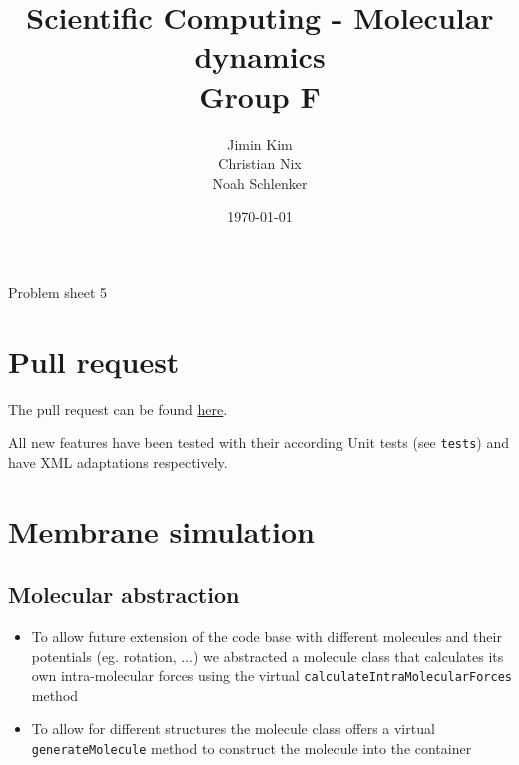 \documentclass{article}
\title{Scientific Computing - Molecular dynamics \\ Group F}
\author{
    Jimin Kim \\
    Christian Nix \\
    Noah Schlenker
}
\date{\today}
\newcommand{\subtitle}{Problem sheet 5}
\begin{document}
\maketitle

\begin{center}
    \LARGE \subtitle{}
\end{center}

\section{Pull request}
\label{sec:pr}
The pull request can be found \href{https://github.com/noahpy/MolSim-SS24/pull/60}{here}.

All new features have been tested with their according Unit tests (see \texttt{tests}) and have XML adaptations respectively.

\section{Membrane simulation}
\label{sec:mem}

    \subsection{Molecular abstraction}
    \label{sec:mem:mol}
        \begin{itemize}
            \item To allow future extension of the code base with different molecules and their potentials (eg. rotation, ...) we abstracted a molecule class that calculates its own intra-molecular forces using the virtual \texttt{calculateIntraMolecularForces} method
            \item To allow for different structures the molecule class offers a virtual \texttt{generateMolecule} method to construct the molecule into the container
        \end{itemize}
\end{document}
